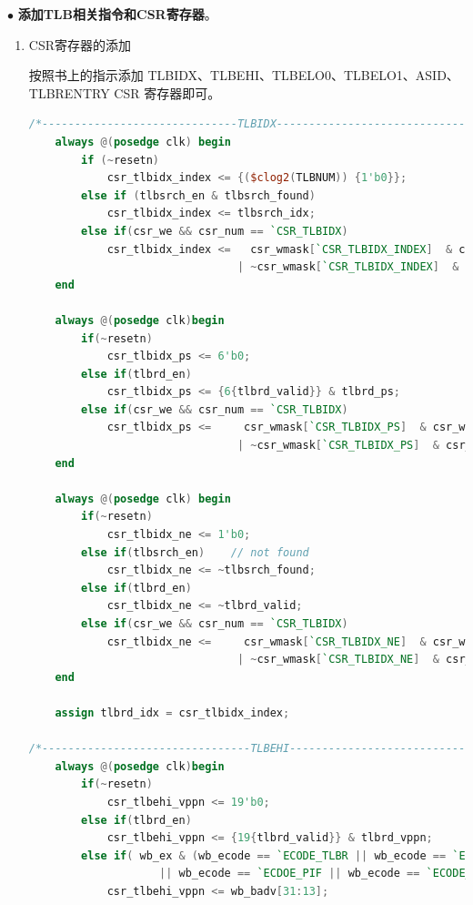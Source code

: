 \documentclass[11pt]{article}
\begin{document}
\noindent
$\bullet$
\textbf{添加TLB相关指令和CSR寄存器}。
\vspace{1ex}
\begin{enumerate}
  \item CSR寄存器的添加

  按照书上的指示添加 TLBIDX、TLBEHI、TLBELO0、TLBELO1、ASID、TLBRENTRY CSR 寄存器即可。\par
  \begin{lstlisting}[language=verilog]
/*------------------------------TLBIDX-------------------------------------------------*/
    always @(posedge clk) begin
        if (~resetn) 
            csr_tlbidx_index <= {($clog2(TLBNUM)) {1'b0}};
        else if (tlbsrch_en & tlbsrch_found) 
            csr_tlbidx_index <= tlbsrch_idx;
        else if(csr_we && csr_num == `CSR_TLBIDX)
            csr_tlbidx_index <=   csr_wmask[`CSR_TLBIDX_INDEX]  & csr_wvalue[`CSR_TLBIDX_INDEX]
                                | ~csr_wmask[`CSR_TLBIDX_INDEX]  & csr_tlbidx_index;       
    end

    always @(posedge clk)begin
        if(~resetn)
            csr_tlbidx_ps <= 6'b0;
        else if(tlbrd_en)
            csr_tlbidx_ps <= {6{tlbrd_valid}} & tlbrd_ps;
        else if(csr_we && csr_num == `CSR_TLBIDX)
            csr_tlbidx_ps <=     csr_wmask[`CSR_TLBIDX_PS]  & csr_wvalue[`CSR_TLBIDX_PS]
                                | ~csr_wmask[`CSR_TLBIDX_PS]  & csr_tlbidx_ps;  
    end

    always @(posedge clk) begin
        if(~resetn)
            csr_tlbidx_ne <= 1'b0;
        else if(tlbsrch_en)    // not found
            csr_tlbidx_ne <= ~tlbsrch_found;
        else if(tlbrd_en)
            csr_tlbidx_ne <= ~tlbrd_valid;
        else if(csr_we && csr_num == `CSR_TLBIDX)
            csr_tlbidx_ne <=     csr_wmask[`CSR_TLBIDX_NE]  & csr_wvalue[`CSR_TLBIDX_NE]
                                | ~csr_wmask[`CSR_TLBIDX_NE]  & csr_tlbidx_ne;  
    end

    assign tlbrd_idx = csr_tlbidx_index;

/*--------------------------------TLBEHI------------------------------------------------------------*/
    always @(posedge clk)begin
        if(~resetn)
            csr_tlbehi_vppn <= 19'b0;
        else if(tlbrd_en)
            csr_tlbehi_vppn <= {19{tlbrd_valid}} & tlbrd_vppn;
        else if( wb_ex & (wb_ecode == `ECODE_TLBR || wb_ecode == `ECODE_PIL|| wb_ecode == `ECODE_PIS 
                    || wb_ecode == `ECDOE_PIF || wb_ecode == `ECODE_PME || wb_ecode == `ECODE_PPI))
            csr_tlbehi_vppn <= wb_badv[31:13];


\end{lstlisting}
\end{enumerate}
\end{document}
